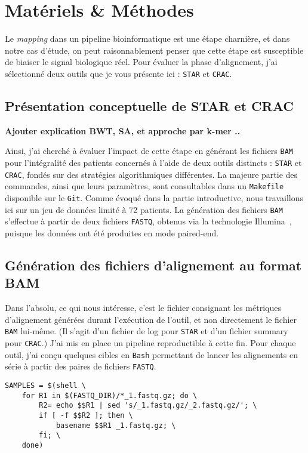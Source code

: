 \section{Matériels \& Méthodes}

Le \og \textit{mapping} \fg{} dans un pipeline bioinformatique est une étape charnière, et dans notre cas d'étude, on peut raisonnablement penser que cette étape est susceptible de biaiser le signal biologique réel.  
Pour évaluer la phase d'alignement, j'ai sélectionné deux outils que je vous présente ici : \texttt{STAR} et \texttt{CRAC}.

\subsection{Présentation conceptuelle de STAR et CRAC}


\textbf{Ajouter explication BWT, SA, et approche par k-mer ..}

Ainsi, j'ai cherché à évaluer l’impact de cette étape en générant les fichiers \texttt{BAM} pour l'intégralité des patients concernés à l’aide de deux outils distincts : \texttt{STAR} et \texttt{CRAC}, 
fondés sur des stratégies algorithmiques différentes. La majeure partie des commandes, ainsi que leurs paramètres, sont consultables dans un \texttt{Makefile} disponible sur le \texttt{Git}.  
Comme évoqué dans la partie introductive, nous travaillons ici sur un jeu de données limité à 72 patients.  
La génération des fichiers \texttt{BAM} s’effectue à partir de deux fichiers \texttt{FASTQ}, obtenus via la technologie Illumina\texttrademark~,
 puisque les données ont été produites en mode \gls{paired-end}.

\subsection{Génération des fichiers d’alignement au format BAM}

Dans l’absolu, ce qui nous intéresse, c’est le fichier consignant les métriques d’alignement générées durant l’exécution de l’outil, et non directement le fichier \texttt{BAM} lui-même.  
(Il s’agit d’un fichier de \og log \fg{} pour \texttt{STAR} et d’un fichier \og summary \fg{} pour \texttt{CRAC}.)  
J’ai mis en place un pipeline reproductible à cette fin.  
Pour chaque outil, j’ai conçu quelques cibles en \texttt{Bash} permettant de lancer les alignements en série à partir des paires de fichiers \texttt{FASTQ}.

\begin{lstlisting}[style=makefileStyle, label={lst:FASTQGen}, caption={\underline{Construction de la variable \texttt{SAMPLES} pour traiter séquentiellement les \texttt{fastq}}}]
SAMPLES = $(shell \
    for R1 in $(FASTQ_DIR)/*_1.fastq.gz; do \
        R2= echo $$R1 | sed 's/_1.fastq.gz/_2.fastq.gz/'; \
        if [ -f $$R2 ]; then \
            basename $$R1 _1.fastq.gz; \
        fi; \
    done)
\end{lstlisting}

